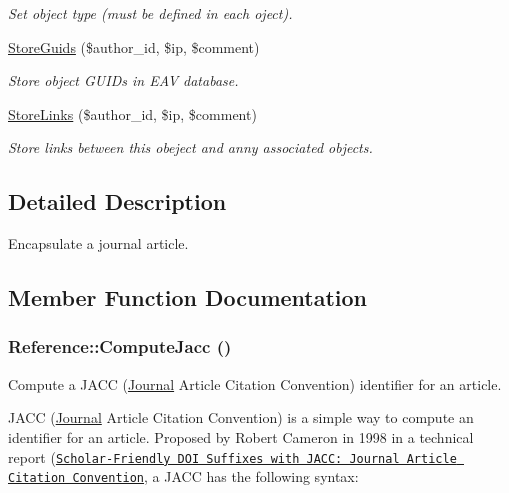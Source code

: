 \begin{CompactItemize}
\begin{CompactList}\small\item\em Set object type (must be defined in each oject). \item\end{CompactList}\item 
\hyperlink{class_reference_eb3baaf7d34623479bbeaeccf8bbd070}{StoreGuids} (\$author\_\-id, \$ip, \$comment)
\begin{CompactList}\small\item\em Store object GUIDs in EAV database. \item\end{CompactList}\item 
\hyperlink{class_reference_fdc9cb746064d8934a3cb8b4b7c66ca6}{StoreLinks} (\$author\_\-id, \$ip, \$comment)
\begin{CompactList}\small\item\em Store links between this obeject and anny associated objects. \item\end{CompactList}\end{CompactItemize}


\subsection{Detailed Description}
Encapsulate a journal article. 

\subsection{Member Function Documentation}
\hypertarget{class_reference_47df8ae6e66cda92ec9eb2ac15c075e6}{
\subsubsection{\setlength{\rightskip}{0pt plus 5cm}Reference::ComputeJacc ()}}
\label{class_reference_47df8ae6e66cda92ec9eb2ac15c075e6}


Compute a JACC (\hyperlink{class_journal}{Journal} Article Citation Convention) identifier for an article. 

JACC (\hyperlink{class_journal}{Journal} Article Citation Convention) is a simple way to compute an identifier for an article. Proposed by Robert Cameron in 1998 in a technical report (\href{ftp://fas.sfu.ca/pub/cs/TR/1998/CMPT1998-08.html}{\tt Scholar-Friendly DOI Suffixes with JACC: Journal Article Citation Convention}, a JACC has the following syntax:

